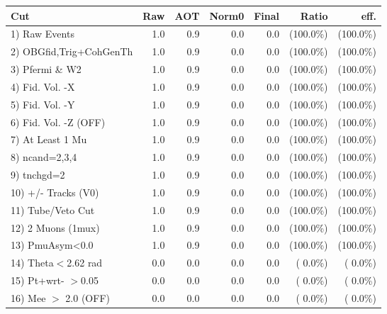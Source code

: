  \begin{table}[h!]\centering
 \begin{tabular}{||l||r|r|r|r|r|r||}
 \hline
 \hline
 Cut & Raw & AOT & Norm0 & Final & Ratio & eff.       \\
 \hline
  1) Raw Events           &          1.0 &          0.9 &          0.0 &          0.0 & (100.0\%) & (100.0\%) \\
  2) OBGfid,Trig+CohGenTh &          1.0 &          0.9 &          0.0 &          0.0 & (100.0\%) & (100.0\%) \\
  3) Pfermi \& W2         &          1.0 &          0.9 &          0.0 &          0.0 & (100.0\%) & (100.0\%) \\
  4) Fid. Vol. -X         &          1.0 &          0.9 &          0.0 &          0.0 & (100.0\%) & (100.0\%) \\
  5) Fid. Vol. -Y         &          1.0 &          0.9 &          0.0 &          0.0 & (100.0\%) & (100.0\%) \\
  6) Fid. Vol. -Z (OFF)   &          1.0 &          0.9 &          0.0 &          0.0 & (100.0\%) & (100.0\%) \\
  7) At Least 1 Mu        &          1.0 &          0.9 &          0.0 &          0.0 & (100.0\%) & (100.0\%) \\
  8) ncand=2,3,4          &          1.0 &          0.9 &          0.0 &          0.0 & (100.0\%) & (100.0\%) \\
  9) tnchgd=2             &          1.0 &          0.9 &          0.0 &          0.0 & (100.0\%) & (100.0\%) \\
 10) +/- Tracks (V0)      &          1.0 &          0.9 &          0.0 &          0.0 & (100.0\%) & (100.0\%) \\
 11) Tube/Veto Cut        &          1.0 &          0.9 &          0.0 &          0.0 & (100.0\%) & (100.0\%) \\
 12) 2 Muons (1mux)       &          1.0 &          0.9 &          0.0 &          0.0 & (100.0\%) & (100.0\%) \\
 13) PmuAsym<0.0          &          1.0 &          0.9 &          0.0 &          0.0 & (100.0\%) & (100.0\%) \\
 14) Theta$<$2.62 rad     &          0.0 &          0.0 &          0.0 &          0.0 & (  0.0\%) & (  0.0\%) \\
 15) Pt+wrt- $>$0.05      &          0.0 &          0.0 &          0.0 &          0.0 & (  0.0\%) & (  0.0\%) \\
 16) Mee $>$ 2.0  (OFF)   &          0.0 &          0.0 &          0.0 &          0.0 & (  0.0\%) & (  0.0\%) \\

\end{tabular}
\end{table}
